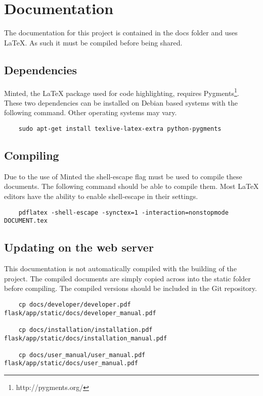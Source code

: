 \section{Documentation}

The documentation for this project is contained in the docs folder and uses LaTeX.  As such it must be compiled before being shared.

\subsection{Dependencies}

Minted, the LaTeX package used for code highlighting, requires Pygments\footnote{http://pygments.org/}.  These two dependencies can be installed on Debian based systems with the following command.  Other operating systems may vary.

\begin{verbatim}
	sudo apt-get install texlive-latex-extra python-pygments
\end{verbatim}

\subsection{Compiling}

Due to the use of Minted the shell-escape flag must be used to compile these documents.  The following command should be able to compile them.  Most LaTeX editors have the ability to enable shell-escape in their settings.

\begin{verbatim}
	pdflatex -shell-escape -synctex=1 -interaction=nonstopmode DOCUMENT.tex
\end{verbatim}

\subsection{Updating on the web server}

This documentation is not automatically compiled with the building of the project.  The compiled documents are simply copied across into the static folder before compiling.  The compiled versions should be included in the Git repository.

\begin{verbatim}
	cp docs/developer/developer.pdf flask/app/static/docs/developer_manual.pdf
	
	cp docs/installation/installation.pdf flask/app/static/docs/installation_manual.pdf
	
	cp docs/user_manual/user_manual.pdf flask/app/static/docs/user_manual.pdf
\end{verbatim}
